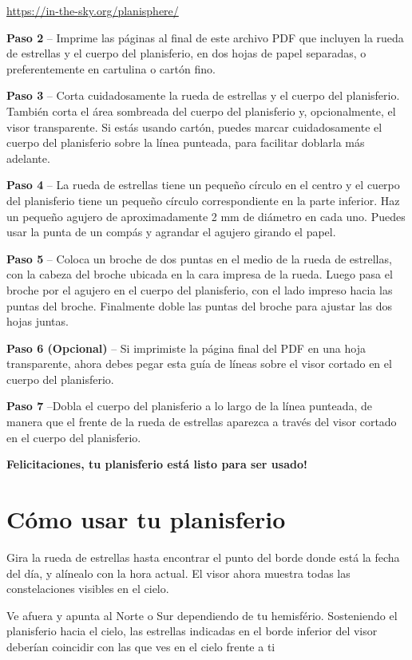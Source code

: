 \documentclass[a4paper,onecolumn,10pt]{article}
\begin{document}
\url{https://in-the-sky.org/planisphere/}

{\bf Paso 2} -- Imprime las páginas al final de este archivo PDF que incluyen la
rueda de estrellas y el cuerpo del planisferio, en dos hojas de papel separadas, o preferentemente
en cartulina o cartón fino.

{\bf Paso 3} -- Corta cuidadosamente la rueda de estrellas y el cuerpo del planisferio. También
corta el área sombreada del cuerpo del planisferio y, opcionalmente, el visor transparente. Si estás
usando cartón, puedes marcar cuidadosamente el cuerpo del planisferio sobre la línea punteada, para
facilitar doblarla más adelante.

{\bf Paso 4} -- La rueda de estrellas tiene un pequeño círculo en el centro y el
cuerpo del planisferio tiene un pequeño círculo correspondiente en la parte inferior.
Haz un pequeño agujero de aproximadamente 2 mm de diámetro en cada uno. Puedes usar
la punta de un compás y agrandar el agujero girando el papel.

{\bf Paso 5} -- Coloca un broche de dos puntas en el medio de la rueda de estrellas,
con la cabeza del broche ubicada en la cara impresa de la rueda. Luego pasa el broche
por el agujero en el cuerpo del planisferio, con el lado impreso hacia las puntas del
broche. Finalmente doble las puntas del broche para ajustar las dos hojas juntas.

{\bf Paso 6 (Opcional)} -- Si imprimiste la página final del PDF en una hoja transparente,
ahora debes pegar esta guía de líneas sobre el visor cortado en el cuerpo del planisferio.

{\bf Paso 7} --Dobla el cuerpo del planisferio a lo largo de la línea punteada, de
manera que el frente de la rueda de estrellas aparezca a través del visor cortado
en el cuerpo del planisferio.

{\bf Felicitaciones, tu planisferio está listo para ser usado!}

\section*{Cómo usar tu planisferio}

Gira la rueda de estrellas hasta encontrar el punto del borde donde está la fecha
del día, y alínealo con la hora actual. El visor ahora muestra todas las constelaciones
visibles en el cielo.

Ve afuera y apunta al Norte o Sur dependiendo de tu hemisfério. Sosteniendo el planisferio
hacia el cielo, las estrellas indicadas en el borde inferior del visor deberían coincidir
con las que ves en el cielo frente a ti
\end{document}
